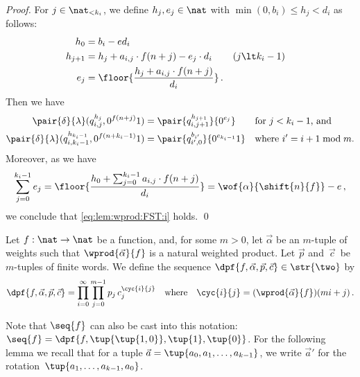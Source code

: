 \begin{proof}
  For $j \in \nat_{< k_i}$, 
  we define $h_j, e_j \in \nat$ with $\min(0,b_i) \le h_j \lt d_i$ as follows:
  \begin{align*}
      h_0 & = b_i - e d_i \\
      h_{j+1} & = h_j + a_{i,j} \cdot f(n+j)  - e_j \cdot d_i && (j \lt k_i - 1) \\
      e_{j} & = \floor{\frac{h_j + a_{i,j} \cdot f(n+j)}{d_i}} \,.
  \end{align*}
  Then we have 
  \begin{align*}
    \pair{\delta}{\lambda}(q_{i,j}^{h_j},0^{f(n+j)} 1) & = \pair{q_{i,j+1}^{h_{j+1}}}{0^{e_{j}}}
    && \text{for $j < k_i - 1$, and} \\
    \pair{\delta}{\lambda}(q_{i,k_i-1}^{h_{k_i-1}},0^{f(n+k_i-1)} 1) & = \pair{q_{i',0}^{b_{i'}}}{0^{e_{k_i-1}} 1}
    && \text{where $i' = i+1 \bmod{m}$.}
  \end{align*}
  Moreover, as we have
  \begin{align*}
    \sum_{j = 0}^{k_i-1} e_j 
    = \floor{\frac{h_0 + \sum_{j=0}^{k_i-1}a_{i,j} \cdot f(n+j)}{d_i}} 
= \wof{\alpha}{\shift{n}{f}} - e \,,
  \end{align*}
  we conclude that \eqref{eq:lem:wprod:FST:i} holds.
  \qed
\end{proof}


\begin{definition}\label{def:doubleprod}
  Let $f : \nat \to \nat$ be a function, and, for some $m > 0$, let $\vec{\alpha}$ be an $m$-tuple of weights
  such that $\wprod{\vec{\alpha}}{f}$ is a natural weighted product.
  Let $\vec{p}$ and~$\vec{c}$\, be $m$-tuples of finite words. 
  We define the sequence $\dpf{f,\vec{\alpha},\vec{p},\vec{c}} \in \str{\two}$ by
  \begin{align*}
    \dpf{f,\vec{\alpha},\vec{p},\vec{c}}
    = \prod_{i = 0}^{\infty} \prod_{j = 0}^{m-1} p_j \, c_j^{\cyc{i}{j}}
    && \text{where} &&
    \cyc{i}{j} = (\wprod{\vec{\alpha}}{f})(mi + j) \,.
  \end{align*}
\end{definition}

Note that $\seq{f}$ can also be cast into this notation:
$\seq{f} = \dpf{f,\tup{\tup{1,0}},\tup{1},\tup{0}}$.
For the following lemma we recall that 
for a tuple $\vec{a} = \tup{a_0,a_1,\ldots,a_{k-1}}$,
we write $\vec{a}'$ for the rotation~$\tup{a_1,\ldots,a_{k-1},a_0}$.

